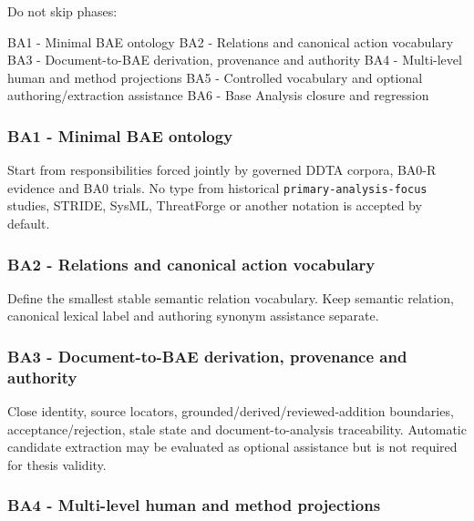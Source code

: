 \documentclass[
  10pt,
  a4paper,
]{article}
\newenvironment{Shaded}{}{}
\newcommand{\NormalTok}[1]{#1}
\begin{document}
Do not skip phases:

\begin{Shaded}
\begin{Highlighting}[]
\NormalTok{BA1 {-} Minimal BAE ontology}
\NormalTok{BA2 {-} Relations and canonical action vocabulary}
\NormalTok{BA3 {-} Document{-}to{-}BAE derivation, provenance and authority}
\NormalTok{BA4 {-} Multi{-}level human and method projections}
\NormalTok{BA5 {-} Controlled vocabulary and optional authoring/extraction assistance}
\NormalTok{BA6 {-} Base Analysis closure and regression}
\end{Highlighting}
\end{Shaded}

\subsubsection{BA1 - Minimal BAE
ontology}\label{ba1---minimal-bae-ontology}

Start from responsibilities forced jointly by governed DDTA corpora,
BA0-R evidence and BA0 trials. No type from historical
\texttt{primary-analysis-focus} studies, STRIDE, SysML, ThreatForge or
another notation is accepted by default.

\subsubsection{BA2 - Relations and canonical action
vocabulary}\label{ba2---relations-and-canonical-action-vocabulary}

Define the smallest stable semantic relation vocabulary. Keep semantic
relation, canonical lexical label and authoring synonym assistance
separate.

\subsubsection{BA3 - Document-to-BAE derivation, provenance and
authority}\label{ba3---document-to-bae-derivation-provenance-and-authority}

Close identity, source locators, grounded/derived/reviewed-addition
boundaries, acceptance/rejection, stale state and document-to-analysis
traceability. Automatic candidate extraction may be evaluated as
optional assistance but is not required for thesis validity.

\subsubsection{BA4 - Multi-level human and method
projections}\label{ba4---multi-level-human-and-method-projections}
\end{document}
